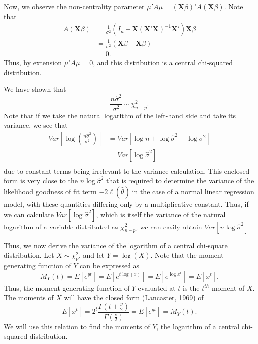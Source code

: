 Now, we observe the non-centrality parameter $\mu 'A \mu = (\mathbf{X} \beta)'A(\mathbf{X} \beta)$. Note that
\begin{equation}
	\begin{split}
	A(\mathbf{X} \beta) & = \frac{1}{\sigma^2} (I_n - \mathbf{X} (\mathbf{X}' \mathbf{X})^{-1} \mathbf{X}')\mathbf{X}\beta  \\ 
	& = \frac{1}{\sigma^2} (\mathbf{X} \beta - \mathbf{X} \beta) \\
	& = 0 .
	\end{split}
\end{equation}
Thus, by extension $\mu 'A \mu = 0$, and this distribution is a central chi-squared distribution.

We have shown that
\begin{equation}
	\frac{n \hat{\sigma}^2}{\sigma^2} \sim \chi^2_{n-p} .
\end{equation}
Note that if we take the natural logarithm of the left-hand side and take its variance, we see that
\begin{equation}
	\begin{split}
		Var \left[ \log(\frac{n \hat{\sigma}^2}{\sigma^2}) \right] & = Var \left[ \log n + \log \hat{\sigma}^2 - \log \sigma^2 \right]  \\ 
		& = Var \left[ \log \hat{\sigma}^2 \right] \\
	\end{split}
\end{equation}
due to constant terms being irrelevant to the variance calculation. This enclosed form is very close to the $n \log \hat{\sigma}^2$ that is required
to determine the variance of the likelihood goodness of fit term $-2 \ell (\hat{\theta} )$ in the case of a normal linear regression model, with these
quantities differing only by a multiplicative constant. Thus, if we can calculate $Var \left[ \log \hat{\sigma}^2 \right]$, which is itself the variance
of the natural logarithm of a variable distributed as $\chi^2_{n-p}$, we can easily obtain $Var \left[ n \log \hat{\sigma}^2 \right]$.

Thus, we now derive the variance of the logarithm of a central chi-square distribution. Let $X \sim \chi^2_{\nu}$, and let $Y = \log(X)$. Note that
the moment generating function of $Y$ can be expressed as
\begin{equation}
	M_Y (t) = E \left[ e^{yt} \right] = E \left[ e^{t\log(x)} \right] = E \left[ e^{\log x^t} \right] = E \left[ x^t \right] .
\end{equation}
Thus, the moment generating function of $Y$ evaluated at $t$ is the $t^{th}$ moment of $X$. The moments of $X$ will have the
closed form (Lancaster, 1969) of
\begin{equation}
	E \left[ x^t \right] = 2^t \frac{\Gamma (t + \frac{\nu}{2})}{\Gamma (\frac{\nu}{2})} = E \left[ e^{yt} \right] = M_Y (t) .
\end{equation}
We will use this relation to find the moments of $Y$, the logarithm of a central chi-squared distribution.


